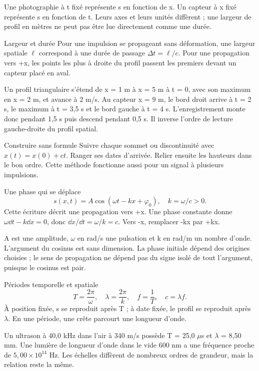 Une photographie à t fixé représente s en fonction de x. Un capteur à x fixé représente s en fonction de t. Leurs axes et leurs unités diffèrent ; une largeur de profil en mètres ne peut pas être lue directement comme une durée.
\begin{loi}{Largeur et durée}
Pour une impulsion se propageant sans déformation, une largeur spatiale $\ell$ correspond à une durée de passage $\Delta t=\ell/c$. Pour une propagation vers +x, les points les plus à droite du profil passent les premiers devant un capteur placé en aval.
\end{loi}
Un profil triangulaire s’étend de x = 1 m à x = 5 m à t = 0, avec son maximum en x = 2 m, et avance à 2 m/s. Au capteur x = 9 m, le bord droit arrive à t = 2 s, le maximum à t = 3,5 s et le bord gauche à t = 4 s. L’enregistrement monte donc pendant 1,5 s puis descend pendant 0,5 s. Il inverse l’ordre de lecture gauche-droite du profil spatial.
\begin{methode}{Construire sans formule}
Suivre chaque sommet ou discontinuité avec $x(t)=x(0)+ct$. Ranger ses dates d’arrivée. Relier ensuite les hauteurs dans le bon ordre. Cette méthode fonctionne aussi pour un signal à plusieurs impulsions.
\end{methode}


\begin{loi}{Une phase qui se déplace}
\[s(x,t)=A\cos(\omega t-kx+\varphi_0),\quad k=\omega/c>0.\]Cette écriture décrit une propagation vers +x. Une phase constante donne $\omega\dd t-k\dd x=0$, donc $\dd x/\dd t=\omega/k=c$. Vers -x, remplacer -kx par +kx.
\end{loi}
A est une amplitude, $\omega$ en rad/s une pulsation et k en rad/m un nombre d’onde. L’argument du cosinus est sans dimension. La phase initiale dépend des origines choisies ; le sens de propagation ne dépend pas du signe isolé de tout l’argument, puisque le cosinus est pair.


\begin{loi}{Périodes temporelle et spatiale}
\[T=\frac{2\pi}{\omega},\quad \lambda=\frac{2\pi}{k},\quad f=\frac1T,\quad c=\lambda f.\]À position fixée, s se reproduit après T ; à date fixée, le profil se reproduit après \ensuremath{\lambda}. En une période, une crête parcourt une longueur d’onde.
\end{loi}
Un ultrason à 40,0 kHz dans l’air à 340 m/s possède T = 25,0 $\mu$s et \ensuremath{\lambda} = 8,50 mm. Une lumière de longueur d’onde dans le vide 600 nm a une fréquence proche de $5{,}00\times10^{14}$ Hz. Les échelles diffèrent de nombreux ordres de grandeur, mais la relation reste la même.


